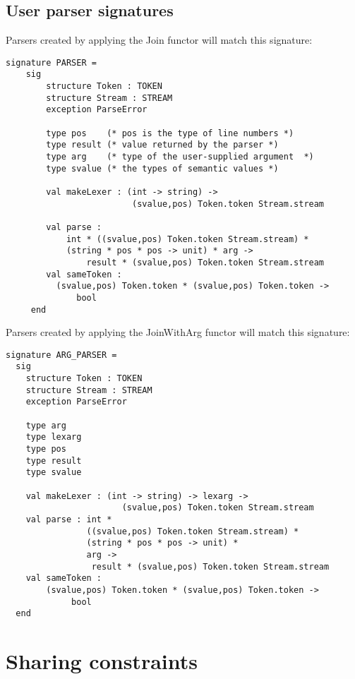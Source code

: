 \subsection{User parser signatures}

Parsers created by applying the Join functor will match this signature:
\begin{tt}
\begin{verbatim}
signature PARSER =
    sig
        structure Token : TOKEN
        structure Stream : STREAM
        exception ParseError

        type pos    (* pos is the type of line numbers *)
        type result (* value returned by the parser *)
        type arg    (* type of the user-supplied argument  *)
        type svalue (* the types of semantic values *)

        val makeLexer : (int -> string) ->
                         (svalue,pos) Token.token Stream.stream

        val parse :
            int * ((svalue,pos) Token.token Stream.stream) *
            (string * pos * pos -> unit) * arg ->
                result * (svalue,pos) Token.token Stream.stream
        val sameToken :
          (svalue,pos) Token.token * (svalue,pos) Token.token ->
              bool
     end
\end{verbatim}
\end{tt}
Parsers created by applying the JoinWithArg functor will match this
signature:
\begin{tt}
\begin{verbatim}
signature ARG_PARSER = 
  sig
    structure Token : TOKEN
    structure Stream : STREAM
    exception ParseError

    type arg
    type lexarg
    type pos
    type result
    type svalue

    val makeLexer : (int -> string) -> lexarg ->
                       (svalue,pos) Token.token Stream.stream
    val parse : int *
                ((svalue,pos) Token.token Stream.stream) *
                (string * pos * pos -> unit) *
                arg ->
                 result * (svalue,pos) Token.token Stream.stream
    val sameToken :
        (svalue,pos) Token.token * (svalue,pos) Token.token ->
             bool
  end
\end{verbatim}
\end{tt}

\section{Sharing constraints}

